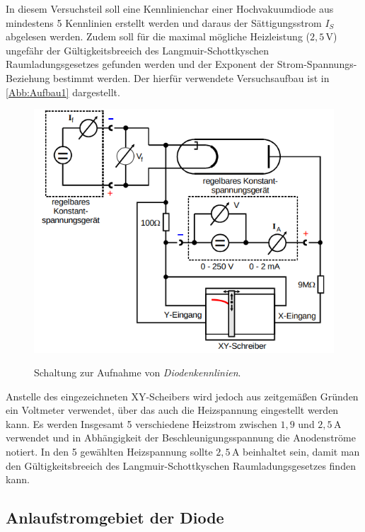 In diesem Versuchsteil soll eine Kennlinienchar einer 
Hochvakuumdiode aus mindestens 5 Kennlinien erstellt werden 
und daraus der Sättigungsstrom $I_S$ abgelesen werden.
Zudem soll für die maximal mögliche Heizleistung ($2,5 \, \si{\volt}$)
ungefähr der Gültigkeitsbreeich des Langmuir-Schottkyschen
Raumladungsgesetzes gefunden werden und der Exponent der
Strom-Spannungs-Beziehung bestimmt werden.
Der hierfür verwendete Versuchsaufbau ist in \autoref{Abb:Aufbau1}
dargestellt.
\begin{figure}[H]
    \centering
    \caption{Schaltung zur Aufnahme von \textit{Diodenkennlinien}.\cite{sample}}
    \includegraphics[width=\textwidth]{Bilder/Aufbau1.png}
    \label{Abb:Aufbau1}
\end{figure}
Anstelle des eingezeichneten XY-Scheibers wird jedoch
aus zeitgemäßen Gründen ein Voltmeter verwendet, über das 
auch die Heizspannung eingestellt werden kann. Es werden Insgesamt
5 verschiedene Heizstrom zwischen $1,9$ und $2,5 \, \si{\ampere}$
verwendet und in Abhängigkeit der Beschleunigungsspannung
die Anodenströme notiert. In den 5 gewählten Heizspannung
sollte $2,5 \, \si{\ampere}$ beinhaltet sein, damit
man den Gültigkeitsbreeich des Langmuir-Schottkyschen
Raumladungsgesetzes finden kann.

\subsection{Anlaufstromgebiet der Diode}

